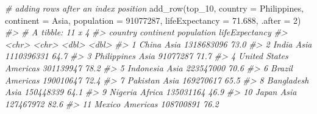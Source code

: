 \documentclass[
]{book}
\newenvironment{Shaded}{\begin{snugshade}}{\end{snugshade}}
\newcommand{\AttributeTok}[1]{\textcolor[rgb]{0.77,0.63,0.00}{#1}}
\newcommand{\CommentTok}[1]{\textcolor[rgb]{0.56,0.35,0.01}{\textit{#1}}}
\newcommand{\DecValTok}[1]{\textcolor[rgb]{0.00,0.00,0.81}{#1}}
\newcommand{\FloatTok}[1]{\textcolor[rgb]{0.00,0.00,0.81}{#1}}
\newcommand{\FunctionTok}[1]{\textcolor[rgb]{0.00,0.00,0.00}{#1}}
\newcommand{\NormalTok}[1]{#1}
\newcommand{\StringTok}[1]{\textcolor[rgb]{0.31,0.60,0.02}{#1}}
\begin{document}
\begin{Shaded}
\begin{Highlighting}[]
\CommentTok{\# adding rows after an index position}
\FunctionTok{add\_row}\NormalTok{(top\_10, }
        \AttributeTok{country =} \StringTok{\textquotesingle{}Philippines\textquotesingle{}}\NormalTok{,}
        \AttributeTok{continent =} \StringTok{\textquotesingle{}Asia\textquotesingle{}}\NormalTok{, }
        \AttributeTok{population =} \DecValTok{91077287}\NormalTok{, }
        \AttributeTok{lifeExpectancy =} \FloatTok{71.688}\NormalTok{, }
        \AttributeTok{.after =} \DecValTok{2}\NormalTok{)}
\CommentTok{\#\textgreater{} \# A tibble: 11 x 4}
\CommentTok{\#\textgreater{}    country       continent population lifeExpectancy}
\CommentTok{\#\textgreater{}    \textless{}chr\textgreater{}         \textless{}chr\textgreater{}          \textless{}dbl\textgreater{}          \textless{}dbl\textgreater{}}
\CommentTok{\#\textgreater{}  1 China         Asia      1318683096           73.0}
\CommentTok{\#\textgreater{}  2 India         Asia      1110396331           64.7}
\CommentTok{\#\textgreater{}  3 Philippines   Asia        91077287           71.7}
\CommentTok{\#\textgreater{}  4 United States Americas   301139947           78.2}
\CommentTok{\#\textgreater{}  5 Indonesia     Asia       223547000           70.6}
\CommentTok{\#\textgreater{}  6 Brazil        Americas   190010647           72.4}
\CommentTok{\#\textgreater{}  7 Pakistan      Asia       169270617           65.5}
\CommentTok{\#\textgreater{}  8 Bangladesh    Asia       150448339           64.1}
\CommentTok{\#\textgreater{}  9 Nigeria       Africa     135031164           46.9}
\CommentTok{\#\textgreater{} 10 Japan         Asia       127467972           82.6}
\CommentTok{\#\textgreater{} 11 Mexico        Americas   108700891           76.2}


\end{Highlighting}
\end{Shaded}
\end{document}

